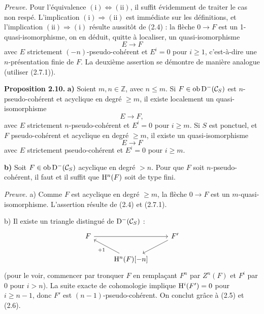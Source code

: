 \documentclass[11pt]{article}
\begin{document}
\emph{Preuve.} Pour l'équivalence \((\mathrm{i})\Leftrightarrow(\mathrm{ii})\), il suffit évidemment de traiter le cas non respé. L'implication \((\mathrm{i})\Rightarrow(\mathrm{ii})\) est immédiate sur les définitions, et l'implication \((\mathrm{ii})\Rightarrow(\mathrm{i})\) résulte aussitôt de (2.4) : la flèche \(0\to F\) est un 1-quasi-isomorphisme, on en déduit, quitte à localiser, un quasi-isomorphisme
\[
  E\longrightarrow F
\]
avec \(E\) strictement \((-n)\)-pseudo-cohérent et \(E^i=0\) pour \(i\geq 1\), c'est-à-dire une \(n\)-présentation finie de \(F\). La deuxième assertion se démontre de manière analogue (utiliser (2.7.1)).

\textbf{Proposition 2.10.} \textbf{a)} Soient \(m,n\in\mathbb Z\), avec \(n\leq m\). Si \(F\in\operatorname{ob}\mathrm D^-(\mathcal C_S)\) est \(n\)-pseudo-cohérent et acyclique en degré \(\geq m\), il existe localement un quasi-isomorphisme
\[
  E\longrightarrow F,
\]
avec \(E\) strictement \(n\)-pseudo-cohérent et \(E^i=0\) pour \(i\geq m\). Si \(S\) est ponctuel, et \(F\) pseudo-cohérent et acyclique en degré \(\geq m\), il existe un quasi-isomorphisme
\[
  E\longrightarrow F
\]
avec \(E\) strictement pseudo-cohérent et \(E^i=0\) pour \(i\geq m\).

\textbf{b)} Soit \(F\in\operatorname{ob}\mathrm D^-(\mathcal C_S)\) acyclique en degré \(>n\). Pour que \(F\) soit \(n\)-pseudo-cohérent, il faut et il suffit que \(\mathrm H^n(F)\) soit de type fini.

\emph{Preuve.} a) Comme \(F\) est acyclique en degré \(\geq m\), la flèche \(0\to F\) est un \(m\)-quasi-isomorphisme. L'assertion résulte de (2.4) et (2.7.1).

b) Il existe un triangle distingué de \(\mathrm D^-(\mathcal C_S)\) :
\[
\begin{tikzcd}
F \arrow[rr] && F' \arrow[dl]\\
& \Ho^n(F)[-n] \arrow[ul,"+1"] &
\end{tikzcd}
\]
(pour le voir, commencer par tronquer \(F\) en remplaçant \(F^n\) par \(Z^n(F)\) et \(F^i\) par \(0\) pour \(i>n\)). La suite exacte de cohomologie implique \(\mathrm H^i(F')=0\) pour \(i\geq n-1\), donc \(F'\) est \((n-1)\)-pseudo-cohérent. On conclut grâce à (2.5) et (2.6).
\end{document}
